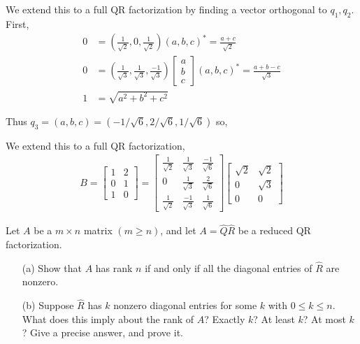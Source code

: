 \documentclass[10pt]{article}
\begin{document}
\begin{solution}[Solution]
\begin{enumerate}
        We extend this to a full QR factorization by finding a vector orthogonal to \( q_1,q_2 \). First,
        \begin{align*}
            0 &= \left(\frac{1}{\sqrt{2}},0,\frac{1}{\sqrt{2}}\right)(a,b,c)^* = \frac{a+c}{\sqrt{2}} \\
            0 &=\left(\frac{1}{\sqrt{3}},\frac{1}{\sqrt{3}},\frac{-1}{\sqrt{3}}\right)\left[\begin{array}{c}a\\b\\c\end{array}\right](a,b,c)^* = \frac{a+b-c}{\sqrt{3}} \\
            1 &=\sqrt{a^2+b^2+c^2}
        \end{align*}

        Thus \( q_3=(a,b,c) = (-1/\sqrt{6},2/\sqrt{6},1/\sqrt{6}) \) so,
        
        We extend this to a full QR factorization,
         \begin{align*}
             B = \left[\begin{array}{cc}1 & 2\\0 & 1\\1 & 0\end{array}\right] = \left[\begin{array}{ccc}\frac{1}{\sqrt{2}} & \frac{1}{\sqrt{3}} & \frac{-1}{\sqrt{6}}\\ 0 & \frac{1}{\sqrt{3}} & \frac{2}{\sqrt{6}} \\ \frac{1}{\sqrt{2}} & \frac{-1}{\sqrt{3}} & \frac{1}{\sqrt{6}} \end{array}\right]\left[\begin{array}{cc}\sqrt{2} & \sqrt{2}  \\ 0 & \sqrt{3}\\0 & 0\end{array}\right]
        \end{align*}


\end{enumerate}
\end{solution}

\begin{problem}[Exercise 7.5]
    Let \( A \) be a \( m\times n \) matrix \( (m\geq n) \), and let \( A=\hat{Q}\hat{R} \) be a reduced QR factorization.
    \begin{enumerate}
        \item[(a)] Show that \( A \) has rank \( n \) if and only if all the diagonal entries of \( \hat{R} \) are nonzero.
        \item[(b)] Suppose \( \hat{R} \) has \( k \) nonzero diagonal entries for some \( k \) with \( 0\leq k\leq n \). What does this imply about the rank of \( A \)? Exactly \( k \)? At least \( k \)? At most \( k \)? Give a precise answer, and prove it.
    \end{enumerate}
\end{problem}
\end{document}
